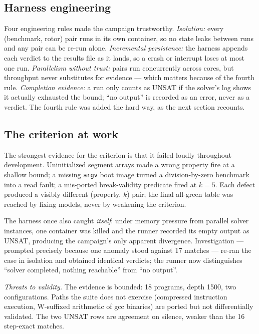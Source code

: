 \documentclass[sigplan,screen,nonacm]{acmart}
\begin{document}
\subsection{Harness engineering}
\label{sec:harness}

Four engineering rules made the campaign trustworthy. \emph{Isolation:}
every (benchmark, rotor) pair runs in its own container, so no state
leaks between runs and any pair can be re-run alone. \emph{Incremental
persistence:} the harness appends each verdict to the results file as
it lands, so a crash or interrupt loses at most one run.
\emph{Parallelism without trust:} pairs run concurrently across cores,
but throughput never substitutes for evidence --- which matters because
of the fourth rule. \emph{Completion evidence:} a run only counts as
UNSAT if the solver's log shows it actually exhausted the bound;
``no output'' is recorded as an error, never as a verdict. The fourth
rule was added the hard way, as the next section recounts.

\subsection{The criterion at work}
\label{sec:atwork}

The strongest evidence for the criterion is that it failed loudly
throughout development. Uninitialized segment arrays made a wrong
property fire at a shallow bound; a missing \texttt{argv} boot image
turned a division-by-zero benchmark into a read fault; a mis-ported
break-validity predicate fired at $k{=}5$. Each defect produced a
visibly different (property, $k$) pair; the final all-green table was
reached by fixing models, never by weakening the criterion.

The harness once also caught \emph{itself}: under memory pressure from
parallel solver instances, one container was killed and the runner
recorded its empty output as UNSAT, producing the campaign's only
apparent divergence. Investigation --- prompted precisely because one
anomaly stood against 17 matches --- re-ran the case in isolation and
obtained identical verdicts; the runner now distinguishes ``solver
completed, nothing reachable'' from ``no output''.

\emph{Threats to validity.} The evidence is bounded: 18 programs, depth
1500, two configurations. Paths the suite does not exercise (compressed
instruction execution, W-suffixed arithmetic of gcc binaries) are
ported but not differentially validated. The two UNSAT rows are
agreement on silence, weaker than the 16 step-exact matches.
\end{document}
